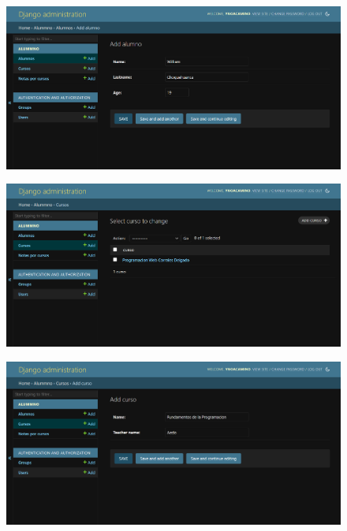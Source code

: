 \documentclass{article}
\begin{document}
	\begin{figure}[H]
		\centering
		\includegraphics[width=1.0\textwidth, keepaspectratio]{img/pagina3}
	\end{figure}
	
	\begin{figure}[H]
		\centering
		\includegraphics[width=1.0\textwidth, keepaspectratio]{img/pagina4}
	\end{figure}
	
	\begin{figure}[H]
		\centering
		\includegraphics[width=1.0\textwidth, keepaspectratio]{img/pagina5}
	\end{figure}
	
\end{document}
